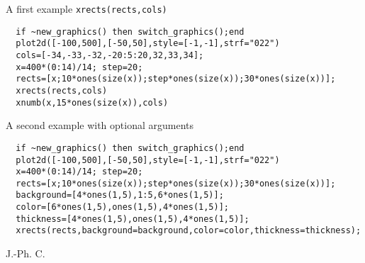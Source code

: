 \begin{examples}

A first example \verb!xrects(rects,cols)!

\begin{Verbatim}
  if ~new_graphics() then switch_graphics();end
  plot2d([-100,500],[-50,50],style=[-1,-1],strf="022")
  cols=[-34,-33,-32,-20:5:20,32,33,34];
  x=400*(0:14)/14; step=20;
  rects=[x;10*ones(size(x));step*ones(size(x));30*ones(size(x))];
  xrects(rects,cols)
  xnumb(x,15*ones(size(x)),cols)
\end{Verbatim}

A second example with optional arguments

\begin{Verbatim}
  if ~new_graphics() then switch_graphics();end
  plot2d([-100,500],[-50,50],style=[-1,-1],strf="022")
  x=400*(0:14)/14; step=20;
  rects=[x;10*ones(size(x));step*ones(size(x));30*ones(size(x))];
  background=[4*ones(1,5),1:5,6*ones(1,5)];
  color=[6*ones(1,5),ones(1,5),4*ones(1,5)];
  thickness=[4*ones(1,5),ones(1,5),4*ones(1,5)];
  xrects(rects,background=background,color=color,thickness=thickness);
\end{Verbatim}

\end{examples}

\begin{manseealso}
   
\end{manseealso}


\begin{authors}
  J.-Ph. C.
\end{authors}
